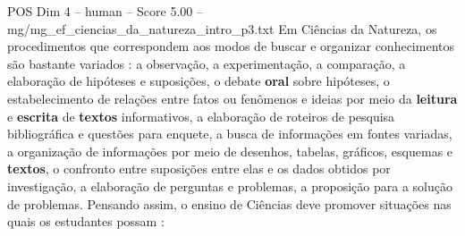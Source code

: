 \begin{textsample}{POS Dim 4 – human – Score 5.00 – mg/mg\_ef\_ciencias\_da\_natureza\_intro\_p3.txt}  \label{ex:f4_pos_014}
Em Ciências da Natureza, os procedimentos que correspondem aos modos de buscar e organizar conhecimentos são bastante variados : a observação, a experimentação, a comparação, a elaboração de hipóteses e suposições, o debate \textbf{oral} sobre hipóteses, o estabelecimento de relações entre fatos ou fenômenos e ideias por meio da \textbf{leitura} e \textbf{escrita} de \textbf{textos} informativos, a elaboração de roteiros de pesquisa bibliográfica e questões para enquete, a busca de informações em fontes variadas, a organização de informações por meio de desenhos, tabelas, gráficos, esquemas e \textbf{textos}, o confronto entre suposições entre elas e os dados obtidos por investigação, a elaboração de perguntas e problemas, a proposição para a solução de problemas.
Pensando assim, o ensino de Ciências deve promover situações nas quais os estudantes possam :

\end{textsample}
